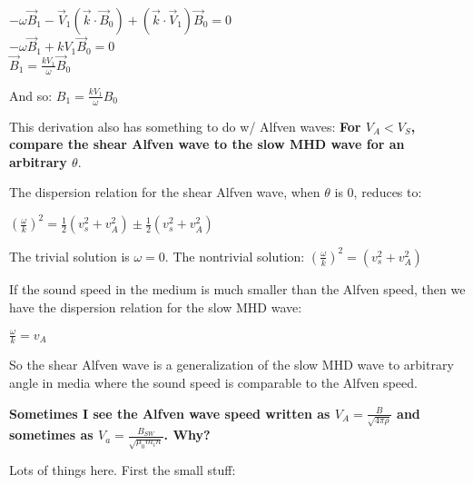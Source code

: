 \vspace{5mm}
\begin{center}
  $-\omega \vec{B}_{1} - \vec{V}_{1}(\vec{k}\cdot\vec{B}_{0}) +
  (\vec{k}\cdot\vec{V}_{1})\vec{B}_{0} = 0$ \\
  $-\omega \vec{B}_{1} + kV_{1}\vec{B}_{0} = 0$ \\
  $\vec{B}_{1} = \frac{kV_{1}}{\omega}\vec{B}_{0}$ \\

\end{center}
\vspace{5mm}

And so: 
  $B_{1} = \frac{kV_{1}}{\omega}B_{0}$




This derivation also has something to do w/ Alfven waves: 
\textbf{For $V_{A}<V_{S}$, compare the shear Alfven wave to the slow
MHD wave for an arbitrary $\theta$}.  

The dispersion relation for the shear Alfven wave, when $\theta$ is 0,
reduces to:

\begin{center}
\begin{math}
  (\frac{\omega}{k})^{2} = \frac{1}{2}(v_{s}^{2}+v_{A}^{2}) \pm
  \frac{1}{2}(v_{s}^{2}+v_{A}^{2})
\end{math}
\end{center}

The trivial solution is $\omega = 0$. The nontrivial solution:
$(\frac{\omega}{k})^{2} = (v_{s}^{2}+v_{A}^{2})$ 

If the sound speed in the medium is much smaller than the Alfven speed, then we have the
dispersion relation for the slow MHD wave:

\begin{center}
\begin{math}
  \frac{\omega}{k} = v_{A}
\end{math}
\end{center}

So the shear Alfven wave is a generalization of the slow MHD wave to
arbitrary angle in media where the sound speed is comparable to the
Alfven speed.




\textbf{Sometimes I see the Alfven wave speed written as
$V_{A}=\frac{B}{\sqrt{4\pi\rho}}$ and sometimes as
$V_{a}=\frac{B_{SW}}{\sqrt{\mu_{0}m_{i}n}}$. Why?}

Lots of things here. First the small stuff:

